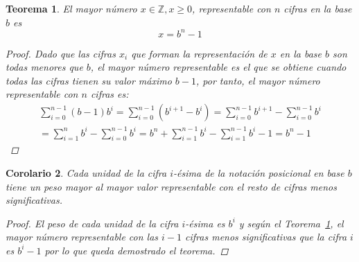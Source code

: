 \documentclass[spanish,a4paper,12pt,titlepage]{article}
\newtheorem{theorem}{Teorema}%
\newtheorem{corollary}[theorem]{Corolario}
\theoremstyle{definition}
\theoremstyle{remark}
\newcommand{\bbZ}{\mathbb{Z}}
\begin{document}
\begin{theorem}\label{theorem-maxn}
    El mayor número $x \in \bbZ, x \ge 0$, representable con $n$ cifras en la
    base $b$ es
    \[
        x = b^n - 1
    \]

    \begin{proof}
        Dado que las cifras $x_i$ que forman la representación de $x$ en la
        base $b$ son todas menores que $b$, el mayor número representable es el
        que se obtiene cuando todas las cifras tienen su valor máximo $b-1$, por
        tanto, el mayor número representable con $n$ cifras es:
        \begin{align*}
            \sum_{i=0}^{n-1} (b-1)b^i
            = \sum_{i=0}^{n-1} \left(b^{i+1}-b^i\right)
            = \sum_{i=0}^{n-1} b^{i+1} - \sum_{i=0}^{n-1} b^i\\
            = \sum_{i=1}^{n} b^{i} - \sum_{i=0}^{n-1} b^i
            = b^n + \sum_{i=1}^{n-1} b^{i} - \sum_{i=1}^{n-1} b^i - 1
            = b^n - 1
        \end{align*}
    \end{proof}
\end{theorem}

\begin{corollary}\label{corollary-pos-digit}
    Cada unidad de la cifra $i$-ésima de la notación posicional en base $b$
    tiene un peso mayor al mayor valor representable con el resto de cifras
    menos significativas.
    \begin{proof}
        El peso de cada unidad de la cifra $i$-ésima es $b^i$ y según
        el Teorema~\ref{theorem-maxn}, el mayor número representable con las
        $i-1$ cifras menos significativas que la cifra $i$ es $b^i-1$ por lo
        que queda demostrado el teorema.
    \end{proof}
\end{corollary}
\end{document}
